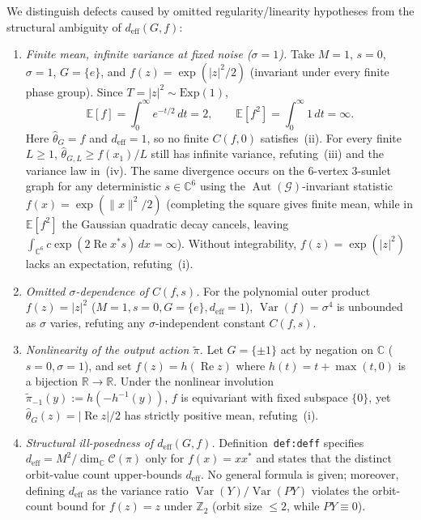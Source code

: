 \documentclass[11pt]{article}
\theoremstyle{plain}
\theoremstyle{definition}
\theoremstyle{remark}
\DeclareMathOperator{\Var}{Var}
\DeclareMathOperator{\Aut}{Aut}
\begin{document}
We distinguish defects caused by omitted regularity/linearity hypotheses from the structural ambiguity of $d_{\mathrm{eff}}(G, f)$:
\begin{enumerate}[label=\textup{(\arabic*)}]
\item \emph{Finite mean, infinite variance at fixed noise ($\sigma = 1$).} Take $M = 1$, $s = 0$, $\sigma = 1$, $G = \{e\}$, and $f(z) = \exp(|z|^2/2)$ (invariant under every finite phase group). Since $T = |z|^2 \sim \mathrm{Exp}(1)$,
\[
\mathbb{E}[f] = \int_0^\infty e^{-t/2}\,dt = 2, \qquad \mathbb{E}[f^2] = \int_0^\infty 1\,dt = \infty.
\]
Here $\hat{\theta}_G = f$ and $d_{\mathrm{eff}} = 1$, so no finite $C(f, 0)$ satisfies~(ii). For every finite $L \ge 1$, $\hat{\theta}_{G,L} \ge f(x_1)/L$ still has infinite variance, refuting~(iii) and the variance law in~(iv). The same divergence occurs on the $6$-vertex $3$-sunlet graph for any deterministic $s \in \mathbb{C}^6$ using the $\Aut(\mathcal{G})$-invariant statistic $f(x) = \exp(\|x\|^2/2)$ (completing the square gives finite mean, while in $\mathbb{E}[f^2]$ the Gaussian quadratic decay cancels, leaving $\int_{\mathbb{C}^6} c\exp(2\operatorname{Re} x^* s)\,dx = \infty$). Without integrability, $f(z) = \exp(|z|^2)$ lacks an expectation, refuting~(i).
\item \emph{Omitted $\sigma$-dependence of $C(f, s)$.} For the polynomial outer product $f(z) = |z|^2$ ($M = 1, s = 0, G = \{e\}, d_{\mathrm{eff}} = 1$), $\Var(f) = \sigma^4$ is unbounded as $\sigma$ varies, refuting any $\sigma$-independent constant $C(f, s)$.
\item \emph{Nonlinearity of the output action $\tilde{\pi}$.} Let $G = \{\pm 1\}$ act by negation on $\mathbb{C}$ ($s = 0, \sigma = 1$), and set $f(z) = h(\operatorname{Re} z)$ where $h(t) = t + \max(t, 0)$ is a bijection $\mathbb{R} \to \mathbb{R}$. Under the nonlinear involution $\tilde{\pi}_{-1}(y) := h(-h^{-1}(y))$, $f$ is equivariant with fixed subspace $\{0\}$, yet $\hat{\theta}_G(z) = |\operatorname{Re} z|/2$ has strictly positive mean, refuting~(i).
\item \emph{Structural ill-posedness of $d_{\mathrm{eff}}(G, f)$.} Definition~\texttt{def:deff} specifies $d_{\mathrm{eff}} = M^2 / \dim_{\mathbb{C}} \mathcal{C}(\pi)$ only for $f(x) = xx^*$ and states that the distinct orbit-value count upper-bounds $d_{\mathrm{eff}}$. No general formula is given; moreover, defining $d_{\mathrm{eff}}$ as the variance ratio $\Var(Y)/\Var(PY)$ violates the orbit-count bound for $f(z) = z$ under $\mathbb{Z}_2$ (orbit size $\le 2$, while $PY \equiv 0$).
\end{enumerate}
\end{document}
